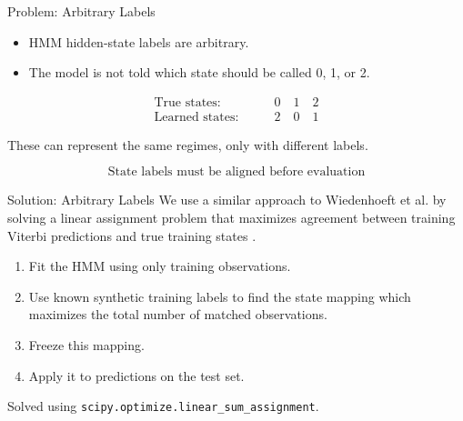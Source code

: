 \begin{frame}{Problem: Arbitrary Labels}

\begin{itemize}
    \item HMM hidden-state labels are \alert{arbitrary}.
    \item The model is not told which state should be called 0, 1, or 2.
\end{itemize}

\vspace{0.4cm}

\begin{align*}
    \text{True states:} &
    \qquad
0 \quad 1 \quad 2 \\
\text{Learned states:} &
\qquad
2 \quad 0 \quad 1
\end{align*}

\vspace{0.3cm}

These can represent the \alert{same regimes}, only with different labels.

\[
\boxed{
\text{State labels must be aligned before evaluation}
}
\]

\end{frame}

\begin{frame}{Solution: Arbitrary Labels}
We use a similar approach to Wiedenhoeft et al. by solving a linear assignment problem that maximizes agreement between training Viterbi predictions and true training states \cite{wiedenhoeft2016}.
\begin{enumerate}
    \item Fit the HMM using only training observations.
    \item Use known synthetic training labels to find the state mapping which maximizes the total number of matched observations.
    \item Freeze this mapping.
    \item Apply it to predictions on the test set.
\end{enumerate}

\vspace{0.2cm}


\footnotesize
Solved using \texttt{scipy.optimize.linear\_sum\_assignment}.

\end{frame}

